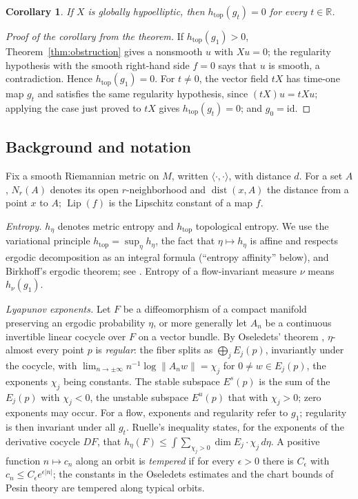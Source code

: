 \documentclass[12pt]{article}
\newtheorem{corollary}[theorem]{Corollary}
\theoremstyle{remark}
\newcommand{\R}{\mathbb R}
\newcommand{\htop}{h_{\mathrm{top}}}
\newcommand{\dist}{\operatorname{dist}}
\newcommand{\Lip}{\operatorname{Lip}}
\begin{document}
\begin{corollary}\label{cor:answer}
If \(X\) is globally hypoelliptic, then \(\htop(g_t)=0\) for every
\(t\in\R\).
\end{corollary}

\begin{proof}[Proof of the corollary from the theorem]
If \(\htop(g_1)>0\), Theorem~\ref{thm:obstruction} gives a nonsmooth
\(u\) with \(Xu=0\); the regularity hypothesis with the smooth
right-hand side \(f=0\) says that \(u\) is smooth, a contradiction.
Hence \(\htop(g_1)=0\).
For \(t\ne0\), the vector field \(tX\) has time-one map \(g_t\) and
satisfies the same regularity hypothesis, since \((tX)u=tXu\); applying
the case just proved to \(tX\) gives \(\htop(g_t)=0\); and
\(g_0=\mathrm{id}\).
\end{proof}

\subsection{Background and notation}
\label{sec:background}

Fix a smooth Riemannian metric on \(M\), written
\(\langle\cdot,\cdot\rangle\), with distance \(d\).  For a set
\(A\), \(N_r(A)\) denotes its open \(r\)-neighborhood and
\(\dist(x,A)\) the distance from a point \(x\) to \(A\);
\(\Lip(f)\) is the Lipschitz constant of a map \(f\).

\emph{Entropy.}  \(h_\eta\) denotes metric entropy and \(\htop\)
topological entropy.  We use the variational principle
\(\htop=\sup_\eta h_\eta\), the fact that \(\eta\mapsto h_\eta\) is
affine and respects ergodic decomposition as an integral formula
(``entropy affinity'' below),
and Birkhoff's ergodic theorem; see \cite{Walters1982}.  Entropy of a
flow-invariant measure \(\nu\) means \(h_\nu(g_1)\).

\emph{Lyapunov exponents.}  Let \(F\) be a diffeomorphism of a
compact manifold preserving an ergodic probability \(\eta\),
or more generally let \(A_n\) be a continuous invertible linear
cocycle over \(F\) on a vector bundle.  By Oseledets' theorem
\cite{Oseledets1968}, \(\eta\)-almost every point
\(p\) is \emph{regular}: the fiber splits as
\(\bigoplus_jE_j(p)\), invariantly under the cocycle, with
\(\lim_{n\to\pm\infty}n^{-1}\log\|A_nw\|=\chi_j\) for
\(0\ne w\in E_j(p)\), the exponents \(\chi_j\) being constants.
The stable subspace \(E^s(p)\) is the sum of the \(E_j(p)\) with
\(\chi_j<0\), the unstable subspace \(E^u(p)\) that with
\(\chi_j>0\); zero exponents may occur.  For a flow, exponents and
regularity refer to \(g_1\); regularity is then
invariant under all \(g_t\).  Ruelle's inequality
\cite{Ruelle1978} states, for the exponents of the derivative
cocycle \(DF\), that
\(h_\eta(F)\le\int\sum_{\chi_j>0}\dim E_j\cdot\chi_j\,d\eta\).
A positive function \(n\mapsto c_n\) along an orbit is
\emph{tempered} if for every \(\epsilon>0\) there is
\(C_\epsilon\) with \(c_n\le C_\epsilon e^{\epsilon|n|}\); the
constants in the Oseledets estimates and the chart bounds of Pesin
theory are tempered along typical orbits.
\end{document}
